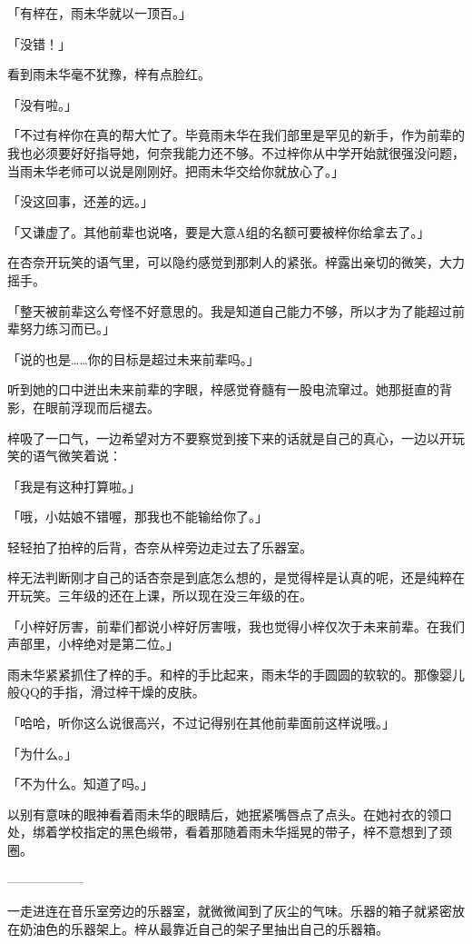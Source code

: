 \documentclass[UTF8]{ctexart}
\begin{document}
    「有梓在，雨未华就以一顶百。」

    「没错！」

    看到雨未华毫不犹豫，梓有点脸红。

    「没有啦。」

    「不过有梓你在真的帮大忙了。毕竟雨未华在我们部里是罕见的新手，作为前辈的我也必须要好好指导她，何奈我能力还不够。不过梓你从中学开始就很强没问题，当雨未华老师可以说是刚刚好。把雨未华交给你就放心了。」

    「没这回事，还差的远。」

    「又谦虚了。其他前辈也说咯，要是大意A组的名额可要被梓你给拿去了。」

    在杏奈开玩笑的语气里，可以隐约感觉到那刺人的紧张。梓露出亲切的微笑，大力摇手。

    「整天被前辈这么夸怪不好意思的。我是知道自己能力不够，所以才为了能超过前辈努力练习而已。」

    「说的也是……你的目标是超过未来前辈吗。」

    听到她的口中迸出未来前辈的字眼，梓感觉脊髓有一股电流窜过。她那挺直的背影，在眼前浮现而后褪去。

    梓吸了一口气，一边希望对方不要察觉到接下来的话就是自己的真心，一边以开玩笑的语气微笑着说：

    「我是有这种打算啦。」

    「哦，小姑娘不错喔，那我也不能输给你了。」

    轻轻拍了拍梓的后背，杏奈从梓旁边走过去了乐器室。

    梓无法判断刚才自己的话杏奈是到底怎么想的，是觉得梓是认真的呢，还是纯粹在开玩笑。三年级的还在上课，所以现在没三年级的在。

    「小梓好厉害，前辈们都说小梓好厉害哦，我也觉得小梓仅次于未来前辈。在我们声部里，小梓绝对是第二位。」

    雨未华紧紧抓住了梓的手。和梓的手比起来，雨未华的手圆圆的软软的。那像婴儿般QQ的手指，滑过梓干燥的皮肤。

    「哈哈，听你这么说很高兴，不过记得别在其他前辈面前这样说哦。」

    「为什么。」

    「不为什么。知道了吗。」

    以别有意味的眼神看着雨未华的眼睛后，她抿紧嘴唇点了点头。在她衬衣的领口处，绑着学校指定的黑色缎带，看着那随着雨未华摇晃的带子，梓不意想到了颈圈。

    ——————

    一走进连在音乐室旁边的乐器室，就微微闻到了灰尘的气味。乐器的箱子就紧密放在奶油色的乐器架上。梓从最靠近自己的架子里抽出自己的乐器箱。
\end{document}
